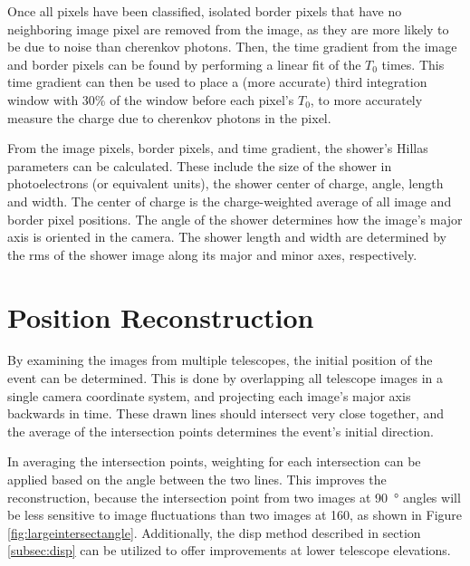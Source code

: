   Once all pixels have been classified, isolated border pixels that have no neighboring image pixel are removed from the image, as they are more likely to be due to noise than cherenkov photons.
  Then, the time gradient from the image and border pixels can be found by performing a linear fit of the $T_{0}$ times.
  This time gradient can then be used to place a (more accurate) third integration window with 30\% of the window before each pixel's $T_{0}$, to more accurately measure the charge due to cherenkov photons in the pixel.

  From the image pixels, border pixels, and time gradient, the shower's Hillas parameters \cite{hillas_params} can be calculated.
  These include the size of the shower in photoelectrons (or equivalent units), the shower center of charge, angle, length and width.
  The center of charge is the charge-weighted average of all image and border pixel positions.
  The angle of the shower determines how the image's major axis is oriented in the camera.
  The shower length and width are determined by the rms of the shower image along its major and minor axes, respectively.

\section{Position Reconstruction}\label{subsec:posrecon}
  By examining the images from multiple telescopes, the initial position of the event can be determined.
  This is done by overlapping all telescope images in a single camera coordinate system, and projecting each image's major axis backwards in time.
  These drawn lines should intersect very close together, and the average of the intersection points determines the event's initial direction.

  In averaging the intersection points, weighting for each intersection can be applied based on the angle between the two lines.
  This improves the reconstruction, because the intersection point from two images at \SI{90}{\degree} angles will be less sensitive to image fluctuations than two images at 160\degree, as shown in Figure \ref{fig:largeintersectangle}.
  Additionally, the disp method described in section \ref{subsec:disp} can be utilized to offer improvements at lower telescope elevations.

